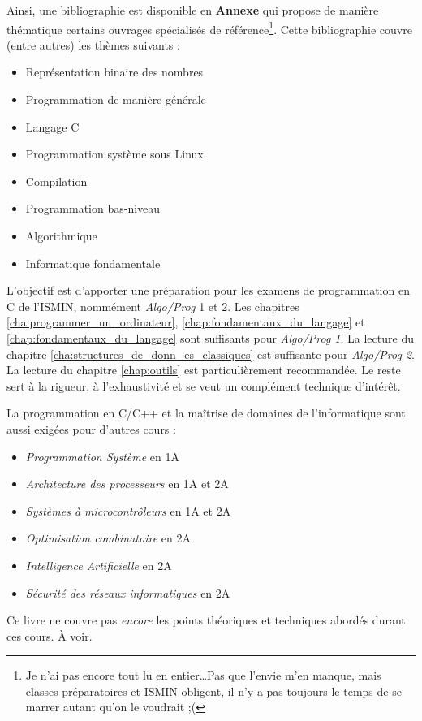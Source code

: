 \documentclass[../main.tex]{subfiles}
\begin{document}
Ainsi, une bibliographie est disponible en \textbf{Annexe} qui propose de manière thématique certains ouvrages spécialisés de référence\footnote{Je n'ai pas encore tout lu en entier\dots Pas que l'envie m'en manque, mais classes préparatoires et ISMIN obligent, il n'y a pas toujours le temps de se marrer autant qu'on le voudrait ;(}. Cette bibliographie couvre (entre autres) les thèmes suivants :
\begin{itemize}
	\item Représentation binaire des nombres \cite{MullerEtAl2018}\cite{BitHacks}
	\item Programmation de manière générale \cite{EoP}
	\item Langage C \cite{KR}\cite{MSRC}\cite{c11}
	\item Programmation système sous Linux \cite{LPI}
	\item Compilation \cite{gnumake}\cite{LL}\cite{AL}\cite{Aho}
	\item Programmation bas-niveau \cite{CSaPP}
	\item Algorithmique \cite{EltAlgorithmie}\cite{TAOCP}
	\item Informatique fondamentale \cite{ONotation}\cite{XFI}
\end{itemize}

L'objectif est d'apporter une préparation pour les examens de programmation en C de l'ISMIN, nommément \textit{Algo/Prog} 1 et 2. Les chapitres \ref{cha:programmer_un_ordinateur}, \ref{chap:fondamentaux_du_langage} et \ref{chap:fondamentaux_du_langage} sont suffisants pour \textit{Algo/Prog 1}. La lecture du chapitre \ref{cha:structures_de_donn_es_classiques} est suffisante pour \textit{Algo/Prog 2}. La lecture du chapitre \ref{chap:outils} est particulièrement recommandée. Le reste sert à la rigueur, à l'exhaustivité et se veut un complément technique d'intérêt.

La programmation en C/C++ et la maîtrise de domaines de l'informatique sont aussi exigées pour d'autres cours :
\begin{itemize}
	\item \textit{Programmation Système} en 1A
	\item \textit{Architecture des processeurs} en 1A et 2A
	\item \textit{Systèmes à microcontrôleurs} en 1A et 2A
	\item \textit{Optimisation combinatoire} en 2A
	\item \textit{Intelligence Artificielle} en 2A
	\item \textit{Sécurité des réseaux informatiques} en 2A
\end{itemize}
Ce livre ne couvre pas \textit{encore} les points théoriques et techniques abordés durant ces cours. À voir.
\end{document}
